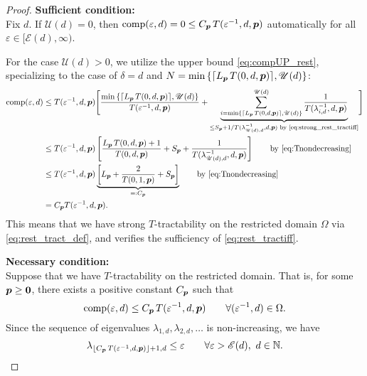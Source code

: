 \documentclass[sort&compress]{elsarticle}
\newcommand{\thed}{\delta}
\newcommand{\theM}{\mathscr{E}}
\newcommand{\theUB}{\mathscr{U}}
\begin{document}
\begin{proof}
    \textbf{Sufficient condition:}\\
Fix $d$.  If $\theUB(d) = 0$, then $\operatorname{comp}(\varepsilon,d) = 0 \le C_{\boldsymbol{p}}\, T(\varepsilon^{-1},d,\boldsymbol{p})$ automatically for all $\varepsilon \in [\theM(d), \infty)$.

For the case $\theUB(d)> 0$, we utilize the upper bound \eqref{eq:compUP_rest}, specializing to the case of $\thed=d$ and $N = \min\left\{\lceil L_{\vp}\, T(0,d,\vp)\rceil,\theUB(d)\right\}$:
\begin{align*}
       \comp(\varepsilon,d)
       & \le T(\varepsilon^{-1},d, \vp) \Biggl [ \frac{\min\left\{\lceil L_{\vp}\, T(0,d,\vp)\rceil,\theUB(d)\right\}}{T(\varepsilon^{-1},d, \vp)}  + \underbrace{\sum_{i = \min\left\{\lceil L_{\vp}\, T(0,d,\vp)\rceil,\theUB(d)\right\}}^{\theUB(d)} \frac{1}{T(\lambda_{i, d}^{-1},d,\vp)}}_{\le S_{\vp} + 1/ T(\lambda_{\theUB(d), d}^{-1},d,\vp) \text{ by \eqref{eq:strong_rest_tractiff}} }
        \Biggr] \\
       & \le T(\varepsilon^{-1},d,\vp)\left[\frac{ L_{\vp}\, T(0,d,\vp)+1}{T(0,d, \vp)} + S_{\vp} + \frac{1}{T(\lambda_{\theUB(d), d}^{-1},d,\vp)} \right]
       \qquad \text{by \eqref{eq:Tnondecreasing}}\\
       & \le T(\varepsilon^{-1},d,\vp) \underbrace{\left[L_{\vp} + \frac{2}{T(0,1, \vp)} + S_{\vp} \right]}_{=:C_{\vp}}
       \qquad \text{by \eqref{eq:Tnondecreasing}}\\
       & =  C_{\vp}T(\varepsilon^{-1},d,\vp).
\end{align*}
This means that we have strong $T$-tractability on the restricted domain $\Omega$ via \eqref{eq:rest_tract_def}, and verifies the sufficiency of \eqref{eq:rest_tractiff}.


\bigskip

\noindent \textbf{Necessary condition:}\\
Suppose that we have
$T$-tractability on the restricted domain. That is, for some $\boldsymbol{p} \ge \boldsymbol{0}$, there exists a positive constant $C_{\boldsymbol{p}}$ such that
\[
\operatorname{comp}(\varepsilon,d)\le C_{\boldsymbol{p}}\, T(\varepsilon^{-1},d,\boldsymbol{p}) \qquad \forall (\varepsilon^{-1}, d) \in \Omega.
\]
Since the sequence of eigenvalues $\lambda_{1,d}, \lambda_{2,d}, \ldots $ is non-increasing, we have
\begin{equation}\label{eq:rest_lambda_K4}
	\lambda_{\lfloor C_{\vp}\, T(\varepsilon^{-1},d,\vp)\rfloor +1,d}\le \varepsilon \qquad
 \forall \varepsilon > \theM(d),\ d \in \naturals.
\end{equation}


\end{proof}
\end{document}
